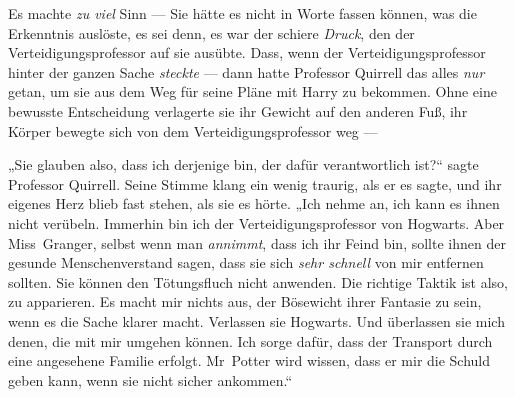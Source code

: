 Es machte \emph{zu viel} Sinn —
%
Sie hätte es nicht in Worte fassen können, was die Erkenntnis auslöste, es sei denn, es war der schiere \emph{Druck}, den der Verteidigungsprofessor auf sie ausübte.
%
Dass, wenn der Verteidigungsprofessor hinter der ganzen Sache \emph{steckte} — dann hatte Professor Quirrell das alles \emph{nur} getan, um sie aus dem Weg für seine Pläne mit Harry zu bekommen.
%
Ohne eine bewusste Entscheidung verlagerte sie ihr Gewicht auf den anderen Fuß, ihr Körper bewegte sich von dem Verteidigungsprofessor weg —

„Sie glauben also, dass ich derjenige bin, der dafür verantwortlich ist?“ sagte Professor Quirrell. Seine Stimme klang ein wenig traurig, als er es sagte, und ihr eigenes Herz blieb fast stehen, als sie es hörte.
„Ich nehme an, ich kann es ihnen nicht verübeln. Immerhin bin ich der Verteidigungsprofessor von Hogwarts. Aber Miss~Granger, selbst wenn man \emph{annimmt}, dass ich ihr Feind bin, sollte ihnen der gesunde Menschenverstand sagen, dass sie sich \emph{sehr schnell} von mir entfernen sollten. Sie können den Tötungsfluch nicht anwenden. Die richtige Taktik ist also, zu apparieren. Es macht mir nichts aus, der Bösewicht ihrer Fantasie zu sein, wenn es die Sache klarer macht. Verlassen sie Hogwarts. Und überlassen sie mich denen, die mit mir umgehen können. Ich sorge dafür, dass der Transport durch eine angesehene Familie erfolgt. Mr~Potter wird wissen, dass er mir die Schuld geben kann, wenn sie nicht sicher ankommen.“

